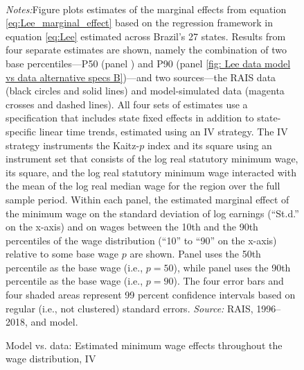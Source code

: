 \begin{figure}[!htb]
  \centering
  \caption{Model vs. data: Estimated minimum wage effects throughout the wage distribution, IV\label{fig: Lee data model vs data alternative specs}}
  \prefigvspace
  \hspace*{\fill}%
  \centerhfill[\qquad\qquad\qquad\qquad\qquad]
  \hspace*{\fill}
  \\
  \postfigvspace
  \begin{minipage}[t]{1\columnwidth}%
    \begin{spacing}{0.75}
      \emph{\scriptsize{}Notes:}{\scriptsize{}Figure plots estimates of the marginal effects from equation \eqref{eq:Lee_marginal_effect} based on the regression framework in equation \eqref{eq:Lee} estimated across Brazil's 27 states. Results from four separate estimates are shown, namely the combination of two base percentiles---P50 (panel ) and P90 (panel \ref{fig: Lee data model vs data alternative specs B})---and two sources---the RAIS data (black circles and solid lines) and model-simulated data (magenta crosses and dashed lines). All four sets of estimates use a specification that includes state fixed effects in addition to state-specific linear time trends, estimated using an IV strategy. The IV strategy instruments the Kaitz-$p$ index and its square using an instrument set that consists of the log real statutory minimum wage, its square, and the log real statutory minimum wage interacted with the mean of the log real median wage for the region over the full sample period. Within each panel, the estimated marginal effect of the minimum wage on the standard deviation of log earnings (``St.d.'' on the x-axis) and on wages between the 10th and the 90th percentiles of the wage distribution (``10'' to ``90'' on the x-axis) relative to some base wage $p$ are shown. Panel  uses the 50th percentile as the base wage (i.e., $p=50$), while panel  uses the 90th percentile as the base wage (i.e., $p=90$). The four error bars and four shaded areas represent 99 percent confidence intervals based on regular (i.e., not clustered) standard errors. %
      \emph{\scriptsize{}Source: } RAIS, 1996--2018, and model.}
    \end{spacing}
  \end{minipage}
\end{figure}



